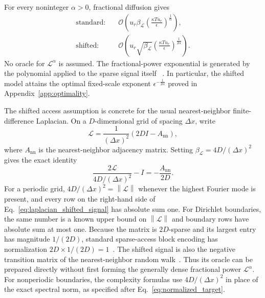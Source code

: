 \documentclass[aps,pra,reprint,floatfix,unsortedaddress,superscriptaddress]{revtex4-2}
\newcommand{\norm}[1]{\left\lVert#1\right\rVert}
\newcommand{\Ocal}{\mathcal{O}}
\begin{document}
For every noninteger $\alpha>0$, fractional diffusion gives
\begin{equation}
\begin{aligned}
\text{standard:}\quad
&\Ocal\!\left(
u_r\beta_{\mathcal L}
\left(\frac{\kappa T u_r}{\epsilon}\right)^{\frac{1}{\alpha}}
\right),
\\[1mm]
\text{shifted:}\quad
&\Ocal\!\left(
u_r\sqrt{\beta_{\mathcal L}}
\left(\frac{\kappa T u_r}{\epsilon}\right)^{\frac{1}{2\alpha}}
\right).
\end{aligned}
\label{eq:fractional_application_queries}
\end{equation}
No oracle for $\mathcal L^\alpha$ is assumed.  The fractional-power
exponential is generated by the polynomial applied to the sparse signal
itself
~\cite{METZLER20001,LISCHKE2020109009}.  In particular, the shifted
model attains the optimal fixed-scale exponent
$\epsilon^{-\frac{1}{2\alpha}}$ proved in Appendix~\ref{app:optimality}.

The shifted access assumption is concrete for the usual nearest-neighbor
finite-difference Laplacian.  On a $D$-dimensional grid of spacing
$\Delta x$, write
\begin{equation}
    \mathcal L
    =
    \frac{1}{(\Delta x)^2}
    \left(2D I-A_{\mathrm{nn}}\right),
    \label{eq:finite_difference_laplacian}
\end{equation}
where $A_{\mathrm{nn}}$ is the nearest-neighbor adjacency matrix.  Setting
$\beta_{\mathcal L}=4D/(\Delta x)^2$ gives the exact identity
\begin{equation}
    \frac{2\mathcal L}{4D/(\Delta x)^2}-I
    =
    -\frac{A_{\mathrm{nn}}}{2D}.
    \label{eq:laplacian_shifted_signal}
\end{equation}
For a periodic grid, $4D/(\Delta x)^2=\norm{\mathcal L}$ whenever the
highest Fourier mode is present, and every row on the right-hand side
of Eq.~\eqref{eq:laplacian_shifted_signal} has absolute sum one.  For
Dirichlet boundaries, the same number is a known upper bound on
$\norm{\mathcal L}$ and boundary rows have absolute sum at most one.
Because the matrix is $2D$-sparse and its largest entry has magnitude
$1/(2D)$, standard sparse-access block encoding has normalization
$2D\times1/(2D)=1$~\cite{Berry2007,Gilyen2019qsvt,
Sunderhauf2024blockencoding,Camps_2022}.
The shifted signal is also the negative transition matrix of the
nearest-neighbor random walk~\cite{1366222}.  Thus its oracle can be prepared
directly without first forming the generally dense fractional power
$\mathcal L^\alpha$.  For nonperiodic boundaries, the complexity
formulas use $4D/(\Delta x)^2$ in place of the exact spectral norm, as
specified after Eq.~\eqref{eq:normalized_target}.
\end{document}
